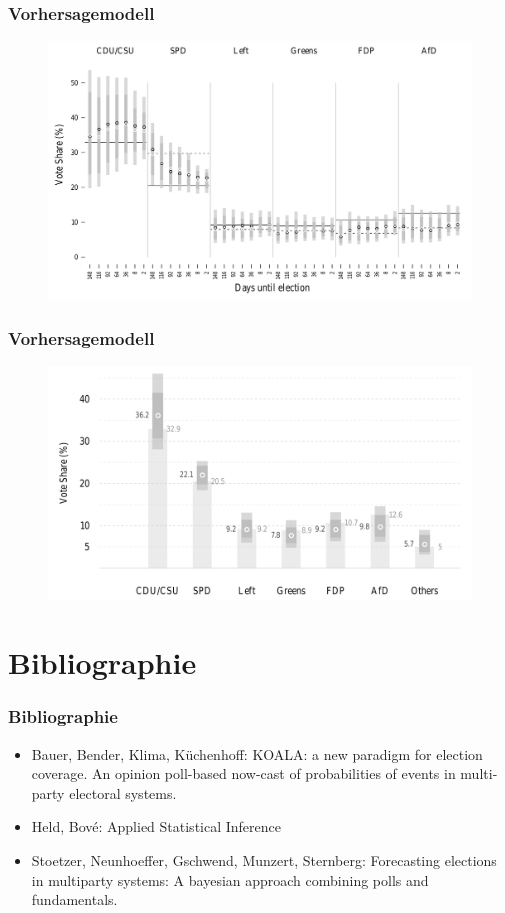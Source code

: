 \documentclass[aspectratio=169,xcolor=dvipsnames]{beamer}
\begin{document}
\begin{frame}
	\frametitle{Vorhersagemodell}
	\begin{figure}
		\includegraphics[height=0.85\textheight]{development}
	\end{figure}
\end{frame}

\begin{frame}
	\frametitle{Vorhersagemodell}
	\begin{figure}
		\includegraphics[height=0.85\textheight]{forecast}
	\end{figure}
\end{frame}

\section{Bibliographie}
\begin{frame}
\frametitle{Bibliographie}
\begin{itemize}
\item Bauer, Bender, Klima, Küchenhoff: KOALA: a new paradigm
for election coverage. An opinion poll-based now-cast of probabilities of events in multi-party electoral systems.
\item Held, Bov\'{e}: Applied Statistical Inference
\item Stoetzer, Neunhoeffer, Gschwend, Munzert, Sternberg: Forecasting elections in multiparty systems: A bayesian approach combining polls and fundamentals.
\end{itemize}
\end{frame}
\end{document}
